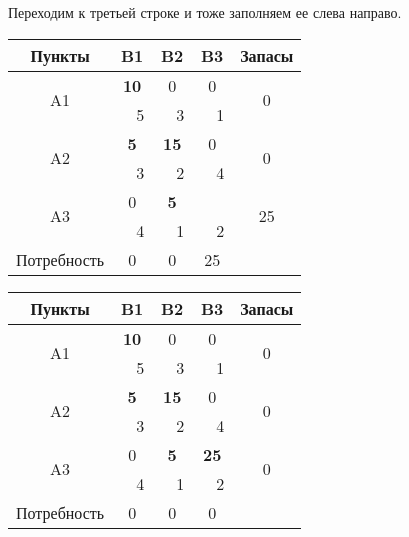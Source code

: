 \documentclass[a4paper,12pt]{article}
\begin{document}
	Переходим к третьей строке и тоже заполняем ее слева направо.
	
	\begin{center}
		\begin{tabular}{|c|c|c|c|c|c|c|c}
			\hline
			Пункты & \multicolumn{2}{c|}{B1} & \multicolumn{2}{c|}{B2} & \multicolumn{2}{c|}{B3} & \multicolumn{1}{c|}{Запасы} \\ \hline
			\multirow{2}{*}{A1} & \multicolumn{2}{c|}{\textbf{10}} & \multicolumn{2}{c|}{0} & \multicolumn{2}{c|}{0} & \multicolumn{1}{c|}{\multirow{2}{*}{0}} \\ \cline{2-7}
			&  & 5 &  & 3 &  & 1 & \multicolumn{1}{c|}{} \\ \hline
			\multirow{2}{*}{A2} & \multicolumn{2}{c|}{\textbf{5}} & \multicolumn{2}{c|}{\textbf{15}} & \multicolumn{2}{c|}{0} & \multicolumn{1}{c|}{\multirow{2}{*}{0}} \\ \cline{2-7}
			&  & 3 &  & 2 &  & 4 & \multicolumn{1}{c|}{} \\ \hline
			\multirow{2}{*}{A3} & \multicolumn{2}{c|}{0} & \multicolumn{2}{c|}{\textbf{5}} & \multicolumn{2}{c|}{} & \multicolumn{1}{c|}{\multirow{2}{*}{25}} \\ \cline{2-7}
			&  & 4 &  & 1 &  & 2 & \multicolumn{1}{c|}{} \\ \hline
			Потребность & \multicolumn{2}{c|}{0} & \multicolumn{2}{c|}{0} & \multicolumn{2}{c|}{25} &  \\ \cline{1-7}
		\end{tabular}
		\begin{tabular}{|c|c|c|c|c|c|c|c}
			\hline
			Пункты & \multicolumn{2}{c|}{B1} & \multicolumn{2}{c|}{B2} & \multicolumn{2}{c|}{B3} & \multicolumn{1}{c|}{Запасы} \\ \hline
			\multirow{2}{*}{A1} & \multicolumn{2}{c|}{\textbf{10}} & \multicolumn{2}{c|}{0} & \multicolumn{2}{c|}{0} & \multicolumn{1}{c|}{\multirow{2}{*}{0}} \\ \cline{2-7}
			&  & 5 &  & 3 &  & 1 & \multicolumn{1}{c|}{} \\ \hline
			\multirow{2}{*}{A2} & \multicolumn{2}{c|}{\textbf{5}} & \multicolumn{2}{c|}{\textbf{15}} & \multicolumn{2}{c|}{0} & \multicolumn{1}{c|}{\multirow{2}{*}{0}} \\ \cline{2-7}
			&  & 3 &  & 2 &  & 4 & \multicolumn{1}{c|}{} \\ \hline
			\multirow{2}{*}{A3} & \multicolumn{2}{c|}{0} & \multicolumn{2}{c|}{\textbf{5}} & \multicolumn{2}{c|}{\textbf{25}} & \multicolumn{1}{c|}{\multirow{2}{*}{0}} \\ \cline{2-7}
			&  & 4 &  & 1 &  & 2 & \multicolumn{1}{c|}{} \\ \hline
			Потребность & \multicolumn{2}{c|}{0} & \multicolumn{2}{c|}{0} & \multicolumn{2}{c|}{0} &  \\ \cline{1-7}
		\end{tabular}
	\end{center}
\end{document}
